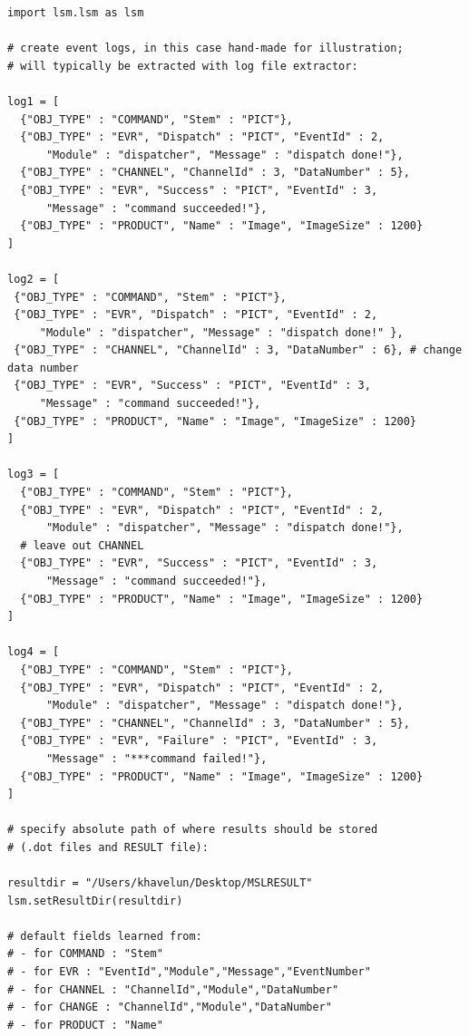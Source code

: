 \documentclass{report}
\begin{document}
\begin{verbatim}
import lsm.lsm as lsm
          
# create event logs, in this case hand-made for illustration; 
# will typically be extracted with log file extractor:

log1 = [
  {"OBJ_TYPE" : "COMMAND", "Stem" : "PICT"},
  {"OBJ_TYPE" : "EVR", "Dispatch" : "PICT", "EventId" : 2, 
      "Module" : "dispatcher", "Message" : "dispatch done!"},
  {"OBJ_TYPE" : "CHANNEL", "ChannelId" : 3, "DataNumber" : 5},
  {"OBJ_TYPE" : "EVR", "Success" : "PICT", "EventId" : 3,
      "Message" : "command succeeded!"},
  {"OBJ_TYPE" : "PRODUCT", "Name" : "Image", "ImageSize" : 1200}
]

log2 = [
 {"OBJ_TYPE" : "COMMAND", "Stem" : "PICT"},
 {"OBJ_TYPE" : "EVR", "Dispatch" : "PICT", "EventId" : 2, 
     "Module" : "dispatcher", "Message" : "dispatch done!" },
 {"OBJ_TYPE" : "CHANNEL", "ChannelId" : 3, "DataNumber" : 6}, # change data number
 {"OBJ_TYPE" : "EVR", "Success" : "PICT", "EventId" : 3, 
     "Message" : "command succeeded!"},
 {"OBJ_TYPE" : "PRODUCT", "Name" : "Image", "ImageSize" : 1200}
]
                 
log3 = [
  {"OBJ_TYPE" : "COMMAND", "Stem" : "PICT"},
  {"OBJ_TYPE" : "EVR", "Dispatch" : "PICT", "EventId" : 2, 
      "Module" : "dispatcher", "Message" : "dispatch done!"},
  # leave out CHANNEL
  {"OBJ_TYPE" : "EVR", "Success" : "PICT", "EventId" : 3, 
      "Message" : "command succeeded!"},
  {"OBJ_TYPE" : "PRODUCT", "Name" : "Image", "ImageSize" : 1200}
]
                 
log4 = [
  {"OBJ_TYPE" : "COMMAND", "Stem" : "PICT"},
  {"OBJ_TYPE" : "EVR", "Dispatch" : "PICT", "EventId" : 2, 
      "Module" : "dispatcher", "Message" : "dispatch done!"},
  {"OBJ_TYPE" : "CHANNEL", "ChannelId" : 3, "DataNumber" : 5},
  {"OBJ_TYPE" : "EVR", "Failure" : "PICT", "EventId" : 3, 
      "Message" : "***command failed!"},
  {"OBJ_TYPE" : "PRODUCT", "Name" : "Image", "ImageSize" : 1200}
]
                    
# specify absolute path of where results should be stored 
# (.dot files and RESULT file):
          
resultdir = "/Users/khavelun/Desktop/MSLRESULT"
lsm.setResultDir(resultdir)
        
# default fields learned from:
# - for COMMAND : "Stem"
# - for EVR : "EventId","Module","Message","EventNumber"
# - for CHANNEL : "ChannelId","Module","DataNumber"
# - for CHANGE : "ChannelId","Module","DataNumber"
# - for PRODUCT : "Name"


\end{verbatim}
\end{document}
